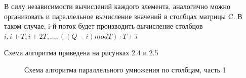 \documentclass[12pt,a4paper]{report}
\begin{document}
В силу независимости вычислений каждого элемента, аналогично можно организовать и параллельное вычисление
значений в столбцах матрицы C. В таком случае, i-й поток будет производить вычисление столбцов
$i, i + T, i + 2T, \dots, ((Q - i) mod T) \cdot T + i$

Схема алгоритма приведена на рисунках 2.4 и 2.5

\begin{figure}[h!]
    \caption{Схема алгоритма параллельного умножения по столбцам, часть 1}
    \label{fig:image}
\end{figure}
\end{document}
